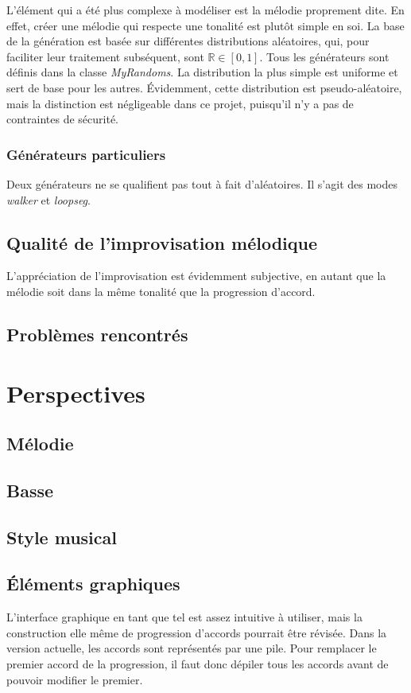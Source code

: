 \documentclass[letterpaper,12pt]{scrartcl}
\begin{document}
	L'élément qui a été plus complexe à modéliser est la mélodie proprement dite. En effet, créer une mélodie qui respecte une tonalité est plutôt simple en soi. La base de la génération est basée sur différentes distributions aléatoires, qui, pour faciliter leur traitement subséquent, sont $\mathbb{R} \in [0,1]$. Tous les générateurs sont définis dans la classe \textit{MyRandoms}. La distribution la plus simple est uniforme et sert de base pour les autres. Évidemment, cette distribution est pseudo-aléatoire, mais la distinction est négligeable dans ce projet, puisqu'il n'y a pas de contraintes de sécurité.
	
	\subsubsection{Générateurs particuliers}
	Deux générateurs ne se qualifient pas tout à fait d'aléatoires. Il s'agit des modes \textit{walker} et \textit{loopseg}.
	\subsection{Qualité de l'improvisation mélodique}
	L'appréciation de l'improvisation est évidemment subjective, en autant que la mélodie soit dans la même tonalité que la progression d'accord. 
	\subsection{Problèmes rencontrés}
	
	\section{Perspectives}
		\subsection{Mélodie}

		\subsection{Basse}
	
		\subsection{Style musical}

		\subsection{Éléments graphiques}
		L'interface graphique en tant que tel est assez intuitive à utiliser, mais la construction elle même de progression d'accords pourrait être révisée. Dans la version actuelle, les accords sont représentés par une pile. Pour remplacer le premier accord de la progression, il faut donc dépiler tous les accords avant de pouvoir modifier le premier.
		
\end{document}
